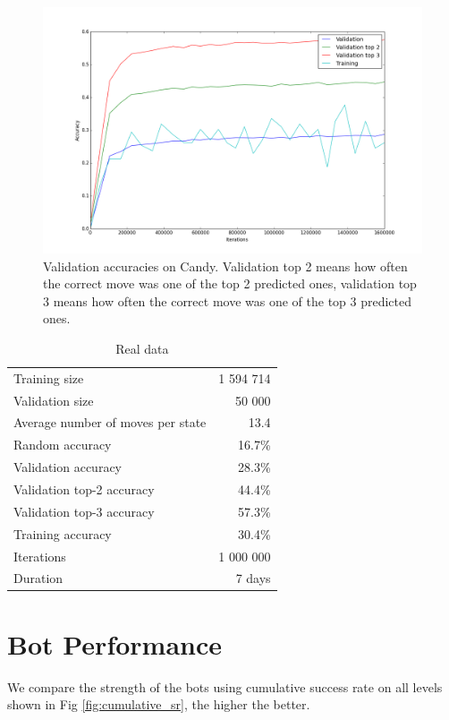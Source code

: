 \documentclass{kththesis}
\begin{document}
\begin{figure}[!htb]
\centering
\includegraphics[width=\textwidth]{images/real_validation.png}
\caption{Validation accuracies on Candy. Validation top 2 means how often the correct move was one of the top 2 predicted ones, validation top 3 means how often the correct move was one of the top 3 predicted ones.}\label{fig:candy_real_validation_accuracy}
\end{figure}

\begin{table}
\caption{Real data}
\centering
\begin{tabular}{ l | r }
\hline
Training size & 1 594 714\\
Validation size & 50 000\\
Average number of moves per state & 13.4 \\
Random accuracy & 16.7\% \\
Validation accuracy & 28.3\% \\
Validation top-2 accuracy & 44.4\% \\
Validation top-3 accuracy & 57.3\% \\
Training accuracy & 30.4\% \\
Iterations & 1 000 000 \\
Duration & 7 days \\
\hline
\end{tabular}
\end{table}

\section{Bot Performance}
We compare the strength of the bots using cumulative success rate on all levels shown in Fig \ref{fig:cumulative_sr}, the higher the better.
\end{document}
